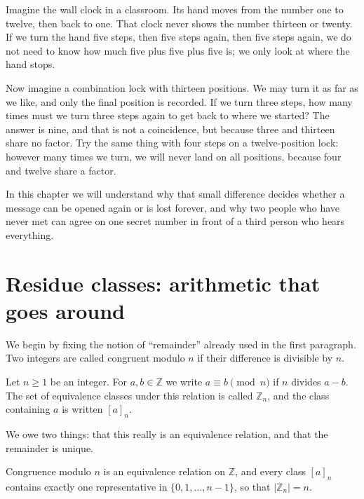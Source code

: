 \begin{untukanak}
Imagine the wall clock in a classroom. Its hand moves from the number one to twelve, then back to
one. That clock never shows the number thirteen or twenty. If we turn the hand five steps, then
five steps again, then five steps again, we do not need to know how much five plus five plus five
is; we only look at where the hand stops.

Now imagine a combination lock with thirteen positions. We may turn it as far as we like, and only
the final position is recorded. If we turn three steps, how many times must we turn three steps
again to get back to where we started? The answer is nine, and that is not a coincidence, but
because three and thirteen share no factor. Try the same thing with four steps on a twelve-position
lock: however many times we turn, we will never land on all positions, because four and twelve
share a factor.

In this chapter we will understand why that small difference decides whether a message can be opened
again or is lost forever, and why two people who have never met can agree on one secret number in
front of a third person who hears everything.
\end{untukanak}

\section{Residue classes: arithmetic that goes around}

We begin by fixing the notion of ``remainder'' already used in the first paragraph.
Two integers are called congruent modulo $n$ if their difference is divisible by $n$.

\begin{definisi}
Let $n\ge1$ be an integer. For $a,b\in\mathbb{Z}$ we write $a\equiv b\pmod{n}$ if $n$ divides
$a-b$. The set of equivalence classes under this relation is called $\mathbb{Z}_n$, and the class
containing $a$ is written $[a]_n$.
\end{definisi}

We owe two things: that this really is an equivalence relation, and that the remainder is unique.

\begin{lemma}
Congruence modulo $n$ is an equivalence relation on $\mathbb{Z}$, and every class $[a]_n$ contains
exactly one representative in $\{0,1,\dots,n-1\}$, so that $|\mathbb{Z}_n|=n$.
\end{lemma}

